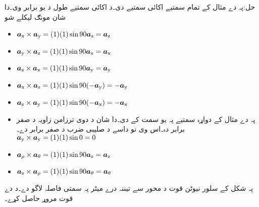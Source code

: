 حل:پہ دے مثال کے تمام سمتیے اکائی سمتیے دی۔د اکائی سمتیے طول د یو برابر وی۔دا شان مونګ لیکلے شو
\begin{itemize}
\item
$\ax \times \ay=(1)(1) \sin 90 \az =\az$\\
\item
$\ay \times \az=(1)(1) \sin 90 \ax =\ax$\\
\item
$\az \times \ax=(1)(1) \sin 90 \ay =\ay$\\
\item
$\ax \times \az=(1)(1) \sin 90 (-\ay) =-\ay$\\
\item
$\az \times \ay=(1)(1) \sin 90 (-\ax) =-\ax$\\
\item
پہ دے مثال کے دواړہ سمتیے پہ یو سمت کے دی۔دا شان د دوی ترزامن زاویہ د صفر برابر دہ۔اس   وی نو داسے د صلیبی ضرب د صفر برابر دے۔
$\ay \times \ay=(1)(1) \sin 0  =0$\\
\item
$\arho \times \atheta=(1)(1) \sin 90  \az =\az$\\
\item
$\az \times \arho=(1)(1) \sin 90 \atheta =\atheta $\\
\end{itemize}
%

پہ شکل  کے سلور نیوٹن قوت  د محور سے تیننہ درے میٹر پہ سمتی فاصلہ   لاگو دے۔د دے قوت مروړ حاصل کړے۔

